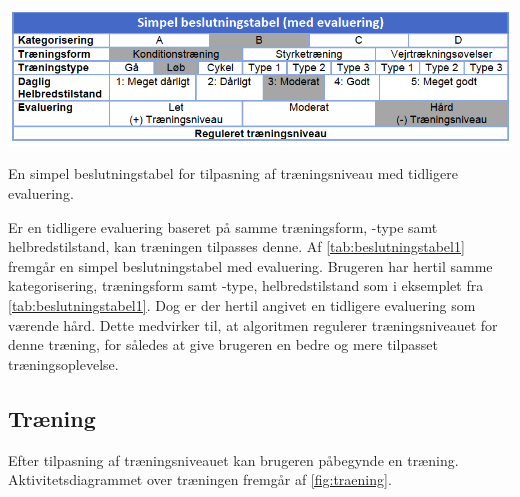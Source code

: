 \begin{table}[H]
\centering
\includegraphics[width=1\textwidth]{figures/aktivitetsdiagram/beslutningstabel1}
\caption{En simpel beslutningstabel for tilpasning af træningsniveau med tidligere evaluering.}
\label{tab:beslutningstabel1}
\end{table} 

\noindent
Er en tidligere evaluering baseret på samme træningsform, -type samt helbredstilstand, kan træningen tilpasses denne. Af \autoref{tab:beslutningstabel1} fremgår en simpel beslutningstabel med evaluering. Brugeren har hertil samme kategorisering, træningsform samt -type, helbredstilstand som i eksemplet fra \autoref{tab:beslutningstabel1}. Dog er der hertil angivet en tidligere evaluering som værende hård. Dette medvirker til, at algoritmen regulerer træningsniveauet for denne træning, for således at give brugeren en bedre og mere tilpasset træningsoplevelse.


\subsection*{Træning} \label{sec:traening}
Efter tilpasning af træningsniveauet kan brugeren påbegynde en træning. Aktivitetsdiagrammet over træningen fremgår af \autoref{fig:traening}. 

